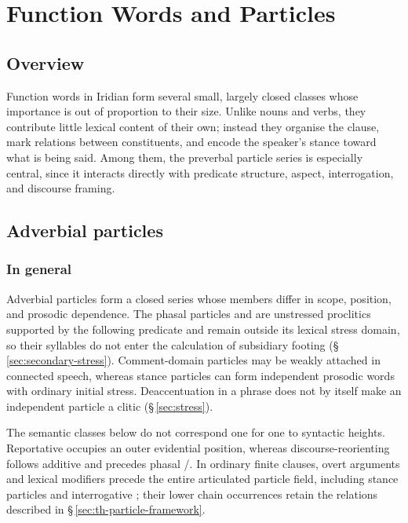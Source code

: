 \chapter{Function Words and Particles}\label{ch:function-words}

\section{Overview}

Function words in Iridian form several small, largely closed classes whose
importance is out of proportion to their size. Unlike nouns and verbs, they
contribute little lexical content of their own; instead they organise the
clause, mark relations between constituents, and encode the speaker's stance
toward what is being said. Among them, the preverbal particle series is
especially central, since it interacts directly with predicate structure,
aspect, interrogation, and discourse framing.

\section{Adverbial particles}\label{sec:adv-particles}

\subsection{In general}\label{sec:adv-particles-general}

Adverbial particles form a closed series whose members differ in scope,
position, and prosodic dependence. The phasal particles  and 
are unstressed proclitics supported by the following predicate and remain
outside its lexical stress domain, so their syllables do not enter the
calculation of subsidiary footing (§\,\ref{sec:secondary-stress}).
Comment-domain particles may be weakly attached in connected speech, whereas
stance particles can form independent prosodic words with ordinary initial
stress. Deaccentuation in a phrase does not by itself make an independent
particle a clitic (§\,\ref{sec:stress}).

The semantic classes below do not correspond one for one to syntactic heights.
Reportative  occupies an outer evidential position, whereas
discourse-reorienting  follows additive  and precedes
phasal /. In ordinary finite clauses, overt arguments
and lexical modifiers precede the entire articulated particle field, including
stance particles and interrogative ; their lower chain occurrences
retain the relations described in §\,\ref{sec:th-particle-framework}.


